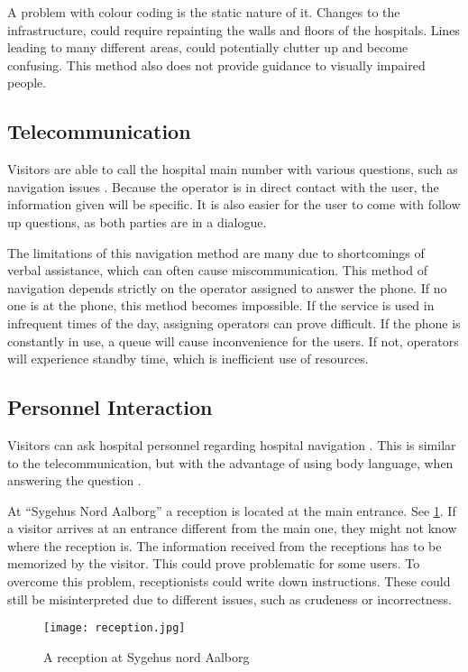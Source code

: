 A problem with colour coding is the static nature of it. Changes to the infrastructure, could require repainting the walls and floors of the hospitals. Lines leading to many different areas, could potentially clutter up and become confusing. This method also does not provide guidance to visually impaired people.

\subsection{Telecommunication}\label{sub:pho}

Visitors are able to call the hospital main number with various questions, such as navigation issues \cite{sign_ring}. Because the operator is in direct contact with the user, the information given will be specific. It is also easier for the user to come with follow up questions, as both parties are in a dialogue.
 
The limitations of this navigation method are many due to shortcomings of verbal assistance, which can often cause miscommunication. This method of navigation depends strictly on the operator assigned to answer the phone. If no one is at the phone, this method becomes impossible.
If the service is used in infrequent times of the day, assigning operators can prove difficult. If the phone is constantly in use, a queue will cause inconvenience for the users. If not, operators will experience standby time, which is inefficient use of resources.

\subsection{Personnel Interaction}\label{sub:human}
Visitors can ask hospital personnel regarding hospital navigation \cite{job}. This is similar to the telecommunication, but with the advantage of using body language, when answering the question \cite{body_vs_phone}.

At \enquote{Sygehus Nord Aalborg} a reception is located at the main entrance. See \cref{fig:rec_booth}. If a visitor arrives at an entrance different from the main one, they might not know where the reception is. The information received from the receptions has to be memorized by the visitor. This could prove problematic for some users. To overcome this problem, receptionists could write down instructions. These could still be misinterpreted due to different issues, such as crudeness or incorrectness.

  \begin{figure}[h!]
    \centering
    \texttt{[image: reception.jpg]}
    \caption{A reception at Sygehus nord Aalborg}
    \label{fig:rec_booth}
  \end{figure}

